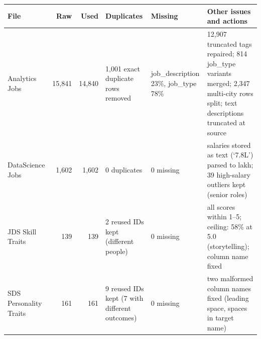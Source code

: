\begin{tabularx}{\linewidth}{@{}l r r L{3.2cm} L{2.6cm} X@{}}
\toprule
File & Raw & Used & Duplicates & Missing & Other issues and actions \\
\midrule
Analytics Jobs & 15,841 & 14,840 & 1,001 exact duplicate rows removed & job\_description 23\%, job\_type 78\% & 12,907 truncated tags repaired; 814 job\_type variants merged; 2,347 multi-city rows split; text descriptions truncated at source \\
DataScience Jobs & 1,602 & 1,602 & 0 duplicates & 0 missing & salaries stored as text (`7.8L') parsed to lakh; 39 high-salary outliers kept (senior roles) \\
JDS Skill Traits & 139 & 139 & 2 reused IDs kept (different people) & 0 missing & all scores within 1--5; ceiling: 58\% at 5.0 (storytelling); column name fixed \\
SDS Personality Traits & 161 & 161 & 9 reused IDs kept (7 with different outcomes) & 0 missing & two malformed column names fixed (leading space, spaces in target name) \\
\bottomrule
\end{tabularx}
